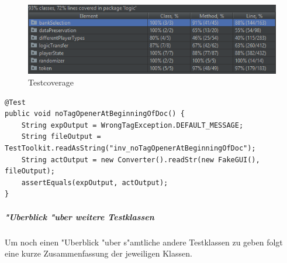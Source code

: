 \begin{figure}
	\centering
	\includegraphics{pics/testCoverage}
	\caption{Testcoverage}
	\label{fig:testCoverage}
\end{figure}

\begin{lstlisting}[float,style=CodeHighlighting,caption=InvalidFileReadTests - test\_noTagOpenerAtBeginningOfDoc,label=lst:test_noTagOpenerAtBeginningOfDoc]
@Test
public void noTagOpenerAtBeginningOfDoc() {
    String expOutput = WrongTagException.DEFAULT_MESSAGE;
    String fileOutput = TestToolkit.readAsString("inv_noTagOpenerAtBeginningOfDoc");
    String actOutput = new Converter().readStr(new FakeGUI(), fileOutput);
    assertEquals(expOutput, actOutput);
}
\end{lstlisting}

\subparagraph{"Uberblick "uber weitere Testklassen}
Um noch einen "Uberblick "uber s"amtliche andere Testklassen zu geben folgt eine kurze Zusammenfassung der jeweiligen Klassen. 

